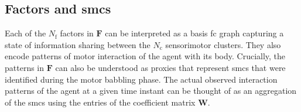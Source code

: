 \textbf{}

\subsection{Factors and \acp{smc}}
Each of the $N_\text{f}$ factors in $\bm{F}$ can be interpreted as a basis \ac{fc} graph capturing a state of information sharing between the $N_\text{c}$ sensorimotor clusters. They also encode patterns of motor interaction of the agent with its body. Crucially, the patterns in $\bm{F}$ can also be understood as proxies that represent \acp{smc} that were identified during the motor babbling phase. The actual observed interaction patterns of the agent at a given time instant can be thought of as an aggregation of the \acp{smc} using the entries of the coefficient matrix $\bm{W}$.

%





